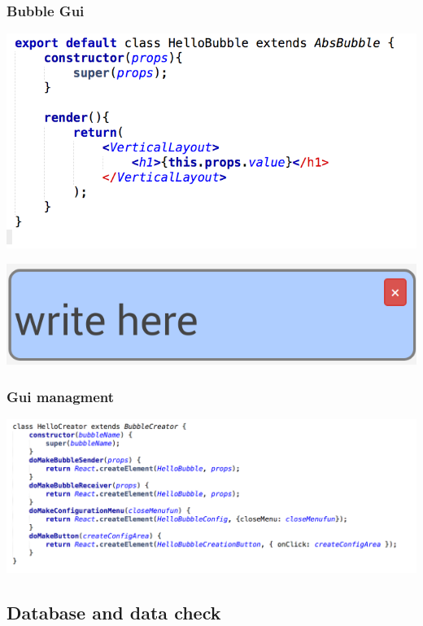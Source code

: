 \begin{frame}
  \frametitle{Bubble Gui}
  \begin{center}
  \begin{minipage}{.65\textwidth}
    \includegraphics[width=\textwidth]{code/hellobubble.png}
  \end{minipage}
    \begin{minipage}{.34\textwidth}
    \includegraphics[width=\textwidth]{code/bubble.png}
  \end{minipage}
  \end{center}
\end{frame}


\begin{frame}
  \frametitle{Gui managment}
  \begin{center}
    \includegraphics[width=.9\textwidth]{code/hellocreator.png}
  \end{center}
\end{frame}


\subsection{Database and data check}

